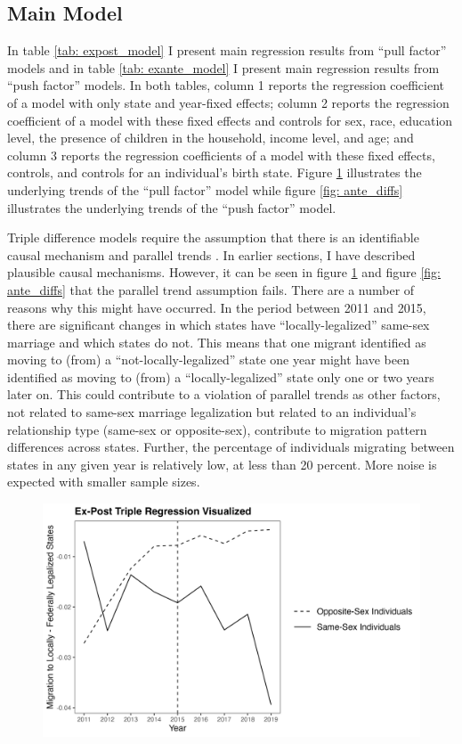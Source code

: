 \documentclass[12pt,letterpaper]{article}
\begin{document}
\clearpage
\subsection{Main Model} %
In table \ref{tab: expost_model} I present main regression results from “pull factor” models and in table \ref{tab: exante_model} I present main regression results from “push factor” models. In both tables, column 1 reports the regression coefficient of a model with only state and year-fixed effects; column 2 reports the regression coefficient of a model with these fixed effects and controls for sex, race, education level, the presence of children in the household, income level, and age; and column 3 reports the regression coefficients of a model with these fixed effects, controls, and controls for an individual’s birth state. Figure \ref{fig: post_diffs} illustrates the underlying trends of the “pull factor” model while figure \ref{fig: ante_diffs} illustrates the underlying trends of the “push factor” model. 

Triple difference models require the assumption that there is an identifiable causal mechanism and parallel trends \citep{24, 25}. In earlier sections, I have described plausible causal mechanisms. However, it can be seen in figure \ref{fig: post_diffs} and figure \ref{fig: ante_diffs} that the parallel trend assumption fails. There are a number of reasons why this might have occurred. In the period between 2011 and 2015, there are significant changes in which states have “locally-legalized” same-sex marriage and which states do not. This means that one migrant identified as moving to (from) a “not-locally-legalized” state one year might have been identified as moving to (from) a “locally-legalized” state only one or two years later on. This could contribute to a violation of parallel trends as other factors, not related to same-sex marriage legalization but related to an individual's relationship type (same-sex or opposite-sex), contribute to migration pattern differences across states. Further, the percentage of individuals migrating between states in any given year is relatively low, at less than 20 percent. More noise is expected with smaller sample sizes. 


\begin{figure}[h]
    \centering
    \includegraphics[width=0.75\linewidth]{outputs/summary_stats/post_diffs.png}
    \caption{}
    \label{fig: post_diffs}
\end{figure}
\end{document}
